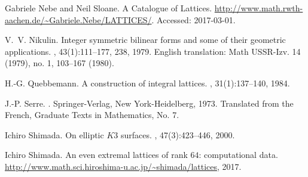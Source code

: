 \documentclass{amsart}
\begin{document}
\begin{thebibliography}{10}
Gabriele Nebe and Neil Sloane.
\newblock A {C}atalogue of {L}attices.
\newblock \url{http://www.math.rwth-aachen.de/~Gabriele.Nebe/LATTICES/}.
\newblock Accessed: 2017-03-01.

V.~V. Nikulin.
\newblock Integer symmetric bilinear forms and some of their geometric
  applications.
, 43(1):111--177, 238, 1979.
\newblock English translation: Math USSR-Izv. 14 (1979), no. 1, 103--167
  (1980).

H.-G. Quebbemann.
\newblock A construction of integral lattices.
, 31(1):137--140, 1984.

J.-P. Serre.
.
\newblock Springer-Verlag, New York-Heidelberg, 1973.
\newblock Translated from the French, Graduate Texts in Mathematics, No. 7.

Ichiro Shimada.
\newblock On elliptic {$K3$} surfaces.
, 47(3):423--446, 2000.

Ichiro Shimada.
\newblock An even extremal lattices of rank $64$: computational data.
\newblock \url{http://www.math.sci.hiroshima-u.ac.jp/~shimada/lattices}, 2017.



\end{thebibliography}
%
%

%
%
\end{document}
